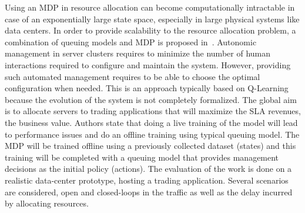 Using an MDP in resource allocation can become computationally intractable in case of an exponentially large state space, especially in large physical systems like data centers. In order to provide scalability to the resource allocation problem, a combination of queuing models and MDP is proposed in~\cite{Tesauro2006}.
Autonomic management in server clusters requires to minimize the number of human interactions required to configure and maintain the system.
However, providing such automated management requires to be able to choose the optimal configuration when needed.
This is an approach typically based on Q-Learning because the evolution of the system is not completely formalized.
The global aim is to allocate servers to trading applications that will maximize the SLA revenues, \ie the business value.
Authors state that doing a live training of the model will lead to performance issues and do an offline training using typical queuing model. The MDP will be trained offline using a previously collected dataset (states) and this training will be completed with a queuing model that provides management decisions as the initial policy (actions).
The evaluation of the work is done on a realistic data-center prototype, hosting a trading application. 
Several scenarios are considered, open and closed-loops in the traffic as well as the delay incurred by allocating resources.



